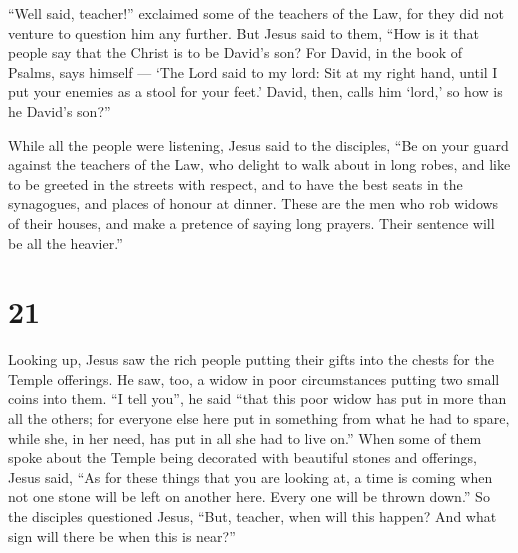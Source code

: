  ``Well said, teacher!'' exclaimed some of the teachers of
the Law,  for they did not venture to question him any
further.  But Jesus said to them, ``How is it that people
say that the Christ is to be David's son?  For David, in
the book of Psalms, says himself --- `The Lord said to my lord: Sit at
my right hand,  until I put your enemies as a stool for
your feet.'  David, then, calls him `lord,' so how is he
David's son?''

 While all the people were listening, Jesus said to the
disciples,  ``Be on your guard against the teachers of the
Law, who delight to walk about in long robes, and like to be greeted in
the streets with respect, and to have the best seats in the synagogues,
and places of honour at dinner.  These are the men who rob
widows of their houses, and make a pretence of saying long prayers.
Their sentence will be all the heavier.''

\hypertarget{section-19}{%
\section{21}\label{section-19}}

 Looking up, Jesus saw the rich people putting their gifts
into the chests for the Temple offerings.  He saw, too, a
widow in poor circumstances putting two small coins into them.
 ``I tell you'', he said ``that this poor widow has put in
more than all the others;  for everyone else here put in
something from what he had to spare, while she, in her need, has put in
all she had to live on.''  When some of them spoke about the
Temple being decorated with beautiful stones and offerings, Jesus said,
 ``As for these things that you are looking at, a time is
coming when not one stone will be left on another here. Every one will
be thrown down.''  So the disciples questioned Jesus, ``But,
teacher, when will this happen? And what sign will there be when this is
near?''

